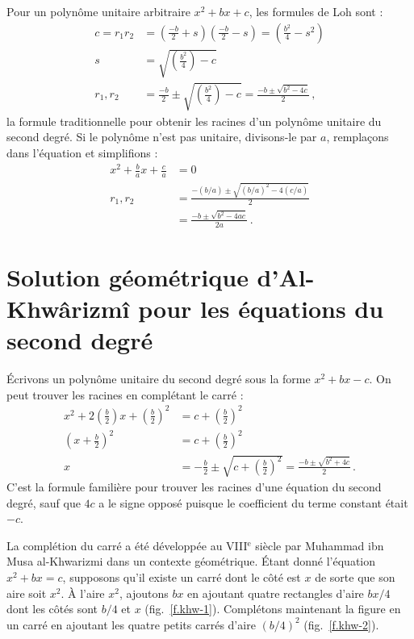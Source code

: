 Pour un polynôme unitaire arbitraire $x^2+bx+c$, les formules de Loh sont :
\begin{align*}
c=r_1r_2&=\left(\frac{-b}{2}+s\right)  \left(\frac{-b}{2}-s\right)=\left(\frac{b^2}{4}-s^2\right)\\
s&=\sqrt{\left(\frac{b^2}{4}\right)-c}\\
r_1,r_2&=\frac{-b}{2}\pm\sqrt{\left(\frac{b^2}{4}\right)-c}=\frac{-b\pm\sqrt{b^2-4c}}{2}\,,
\end{align*}
la formule traditionnelle pour obtenir les racines d'un polynôme unitaire du second degré. Si le polynôme n'est pas unitaire, divisons-le par $a$, remplaçons dans l'équation et simplifions :
\begin{align*}
x^2+\frac{b}{a}x+\frac{c}{a}&=0\\
r_1,r_2&=\frac{-(b/a)\pm\sqrt{(b/a)^2-4(c/a)}}{2}\\
&=\frac{-b\pm\sqrt{b^2-4ac}}{2a}\,.
\end{align*}

\section{Solution géométrique d'Al-Khwârizmî pour les équations du second degré }\label{s.khwar}

Écrivons un polynôme unitaire du second degré sous la forme $x^2+bx-c$. On peut trouver les racines en complétant le carré :
\begin{align*}
x^2+2\left(\frac{b}{2}\right)x+\left(\frac{b}{2}\right)^2&=c+\left(\frac{b}{2}\right)^2\\
\left(x+\frac{b}{2}\right)^2&=c+\left(\frac{b}{2}\right)^2\\
x&=-\frac{b}{2}\pm\sqrt{c+\left(\frac{b}{2}\right)^2}=
\frac{-b\pm\sqrt{b^2+4c}}{2}\,.
\end{align*}
C'est la formule familière pour trouver les racines d'une équation du second degré, sauf que $4c$ a le signe opposé puisque le coefficient du terme constant était $-c$.

La complétion du carré a été développée au VIII$^\text{e}$  siècle par Muhammad ibn Musa al-Khwarizmi dans un contexte géométrique. Étant donné l'équation $x^2+bx=c$, supposons qu'il existe un carré dont le côté est $x$ de sorte que son aire soit  $x^2$.
À l'aire $x^2$, ajoutons $bx$ en ajoutant quatre rectangles d'aire $bx/4$ dont les côtés sont $b/4$ et $x$ (fig.~\ref{f.khw-1}). Complétons maintenant la figure  en un carré en ajoutant les quatre petits carrés d'aire $(b/4)^2$ (fig.~\ref{f.khw-2}).

